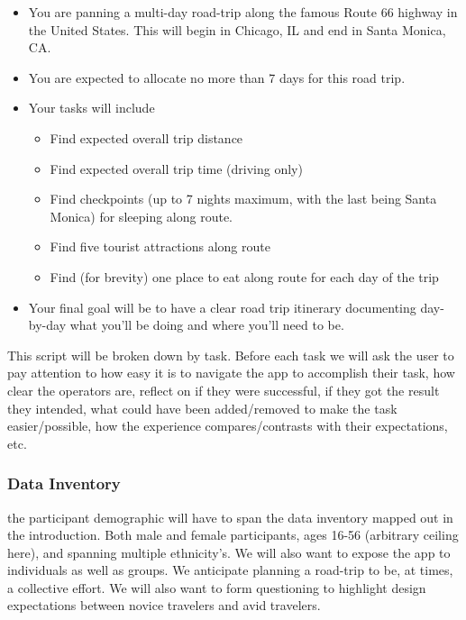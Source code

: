 \begin{itemize}
\item
  You are panning a multi-day road-trip along the famous Route 66 highway in the United States. This will begin in Chicago, IL and end in Santa Monica, CA.
\item
  You are expected to allocate no more than 7 days for this road trip.
\item
  Your tasks will include
  \begin{itemize}
  \item
    Find expected overall trip distance
  \item
    Find expected overall trip time (driving only)
  \item
    Find checkpoints (up to 7 nights maximum, with the last being Santa Monica) for sleeping along route.
  \item
    Find five tourist attractions along route
  \item
    Find (for brevity) one place to eat along route for each day of the trip
  \end{itemize}
\item
  Your final goal will be to have a clear road trip itinerary documenting day-by-day what you'll be doing and where you'll need to be.
\end{itemize}

This script will be broken down by task. Before each task we will ask the user to pay attention to how easy it is to navigate the app to accomplish their task, how clear the operators are, reflect on if they were successful, if they got the result they intended, what could have been added/removed to make the task easier/possible, how the experience compares/contrasts with their expectations, etc.

\subsubsection{Data Inventory} the participant demographic will have to span the data inventory mapped out in the introduction. Both male and female participants, ages 16-56 (arbitrary ceiling here), and spanning multiple ethnicity's. We will also want to expose the app to individuals as well as groups. We anticipate planning a road-trip to be, at times, a collective effort. We will also want to form questioning to highlight design expectations between novice travelers and avid travelers.

